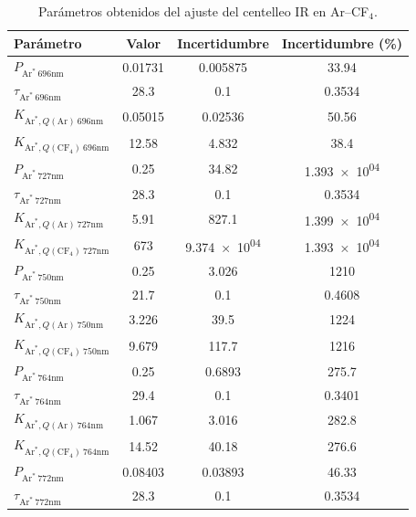 \begin{table}[htbp]
\centering
\caption{Parámetros obtenidos del ajuste del centelleo IR en Ar--CF$_4$.}
\label{tab:ArCF4_IR_fit}
\begin{tabular}{lccc}
\toprule
Parámetro & Valor & Incertidumbre & Incertidumbre (\%) \\
\midrule
$P_{\mathrm{Ar}^* \ 696 \mathrm{nm}}$ & \num{0.01731} & \num{0.005875} & \num{33.94} \\
$\tau_{\mathrm{Ar}^* \ 696 \mathrm{nm}}$ & \num{28.3} & \num{0.1} & \num{0.3534} \\
$K_{\mathrm{Ar}^*, Q(\mathrm{Ar}) \ 696 \mathrm{nm}}$ & \num{0.05015} & \num{0.02536} & \num{50.56} \\
$K_{\mathrm{Ar}^*, Q(\mathrm{CF}_4) \ 696 \mathrm{nm}}$ & \num{12.58} & \num{4.832} & \num{38.4} \\
$P_{\mathrm{Ar}^* \ 727 \mathrm{nm}}$ & \num{0.25} & \num{34.82} & \num{1.393e+04} \\
$\tau_{\mathrm{Ar}^* \ 727 \mathrm{nm}}$ & \num{28.3} & \num{0.1} & \num{0.3534} \\
$K_{\mathrm{Ar}^*, Q(\mathrm{Ar}) \ 727 \mathrm{nm}}$ & \num{5.91} & \num{827.1} & \num{1.399e+04} \\
$K_{\mathrm{Ar}^*, Q(\mathrm{CF}_4) \ 727 \mathrm{nm}}$ & \num{673} & \num{9.374e+04} & \num{1.393e+04} \\
$P_{\mathrm{Ar}^* \ 750 \mathrm{nm}}$ & \num{0.25} & \num{3.026} & \num{1210} \\
$\tau_{\mathrm{Ar}^* \ 750 \mathrm{nm}}$ & \num{21.7} & \num{0.1} & \num{0.4608} \\
$K_{\mathrm{Ar}^*, Q(\mathrm{Ar}) \ 750 \mathrm{nm}}$ & \num{3.226} & \num{39.5} & \num{1224} \\
$K_{\mathrm{Ar}^*, Q(\mathrm{CF}_4) \ 750 \mathrm{nm}}$ & \num{9.679} & \num{117.7} & \num{1216} \\
$P_{\mathrm{Ar}^* \ 764 \mathrm{nm}}$ & \num{0.25} & \num{0.6893} & \num{275.7} \\
$\tau_{\mathrm{Ar}^* \ 764 \mathrm{nm}}$ & \num{29.4} & \num{0.1} & \num{0.3401} \\
$K_{\mathrm{Ar}^*, Q(\mathrm{Ar}) \ 764 \mathrm{nm}}$ & \num{1.067} & \num{3.016} & \num{282.8} \\
$K_{\mathrm{Ar}^*, Q(\mathrm{CF}_4) \ 764 \mathrm{nm}}$ & \num{14.52} & \num{40.18} & \num{276.6} \\
$P_{\mathrm{Ar}^* \ 772 \mathrm{nm}}$ & \num{0.08403} & \num{0.03893} & \num{46.33} \\
$\tau_{\mathrm{Ar}^* \ 772 \mathrm{nm}}$ & \num{28.3} & \num{0.1} & \num{0.3534} \\

\end{tabular}
\end{table}
